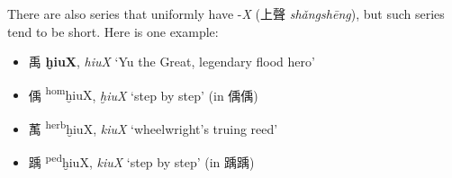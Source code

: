 There are also series that uniformly have -\textit{X} (上聲 \textit{shǎngshēng}), but such series tend to be short. Here is one example: 



\begin{itemize}
    \item {\Large{禹}}  %
    {\large{\textbf{ḫiuX}}},  
    \textit{hiuX}       %
    `Yu the Great, legendary flood hero'

    \item {\Large{偊}}  %
    {\large{\textsuperscript{hom}ḫiuX}},  
    \textit{ḫiuX}       %
    `step by step' (in 偊偊)  


    \item {\Large{萭}}  %
    {\large{\textsuperscript{herb}ḫiuX}},  
    \textit{kiuX}       %
    `wheelwright's truing reed'

    \item {\Large{踽}}  %
    {\large{\textsuperscript{ped}ḫiuX}},  
    \textit{kiuX}       %
    `step by step' (in 踽踽)
\end{itemize}















